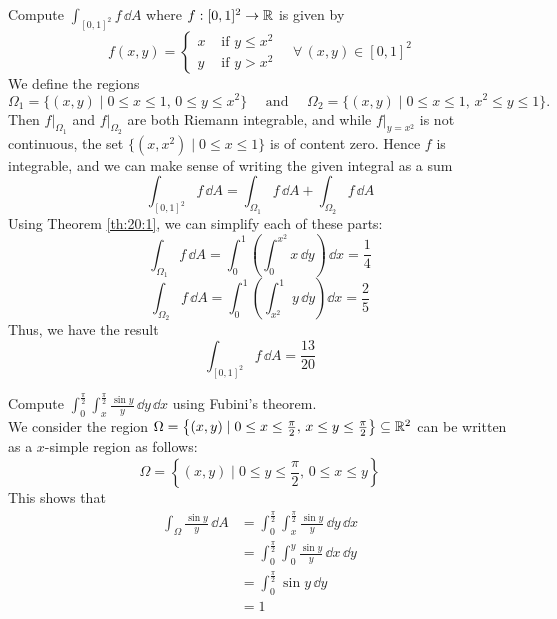 \documentclass[../Analysis-3.tex]{subfiles}
\begin{document}
\begin{Eg}{}{}
  Compute $\displaystyle\int_{[0,1]^2} f \, \dd A$ where $f : [0,1]^2 \to \mathbb{R}$ is given by
  \[
    f(x,y) = \begin{cases}
      x & \mbox{ if } y \leq x^2 \\ y & \mbox{ if } y > x^2
    \end{cases} \quad \forall \, (x,y) \in [0,1]^2
  \]
  We define the regions
  \[
    \Omega_1 = \{ (x,y) \mid 0 \leq x \leq 1, \, 0 \leq y \leq x^2 \} \quad \mbox{ and } \quad \Omega_2 = \{ (x,y) \mid 0 \leq x \leq 1, \, x^2 \leq y \leq 1 \}.
  \]
  Then $f\vert_{\Omega_1}$ and $f\vert_{\Omega_2}$ are both Riemann integrable, and while $f\vert_{y=x^2}$ is not continuous, the set $\{ (x,x^2) \mid 0 \leq x \leq 1 \}$ is of content zero. Hence $f$ is integrable, and we can make sense of writing the given integral as a sum
  \[
    \int_{[0,1]^2} f \, \dd A = \int_{\Omega_1} f \, \dd A + \int_{\Omega_2} f \, \dd A
  \]
  Using Theorem \ref{th:20:1}, we can simplify each of these parts:
  \[
    \int_{\Omega_1} f \, \dd A = \int_0^1 \left( \int_0^{x^2} x \, \dd y \right)\, \dd x = \frac{1}{4}
  \]
  \[
    \int_{\Omega_2} f \, \dd A = \int_0^1 \left( \int_{x^2}^1 y \, \dd y\right)\dd x = \frac{2}{5}
  \]
  Thus, we have the result
  \[
    \int_{[0,1]^2} f \, \dd A = \frac{13}{20}
  \]
\end{Eg}

\begin{Eg}{}{}
  Compute $\displaystyle{ \int_0^{\frac{\pi}{2}} \int_x^{\frac{\pi}{2}}} \frac{\sin y}{y} \, \dd y \, \dd x$ using Fubini's theorem.\\[.1 cm]
  We consider the region $\Omega = \left\{ (x,y) \mid 0 \leq x \leq \frac{\pi}{2}, \, x \leq y \leq \frac{\pi}{2} \right\} \subseteq \mathbb{R}^2$ can be written as a $x$-simple region as follows:
  \[
    \Omega = \left\{ (x,y) \mid 0 \leq y \leq \frac{\pi}{2}, \, 0 \leq x \leq y \right\}
  \]
  This shows that
  \begin{align*}
    \int_{\Omega} \frac{\sin y}{y} \, \dd A
     & = \int_{0}^{\frac{\pi}{2}} \int_x^{\frac{\pi}{2}} \frac{\sin y}{y} \, \dd y \, \dd x \\
     & = \int_0^{\frac{\pi}{2}} \int_0^y \frac{\sin y}{y} \, \dd x \, \dd y                 \\
     & = \int_0^{\frac{\pi}{2}} \sin y \, \dd y\\
     & = 1
  \end{align*}
\end{Eg}
\end{document}
